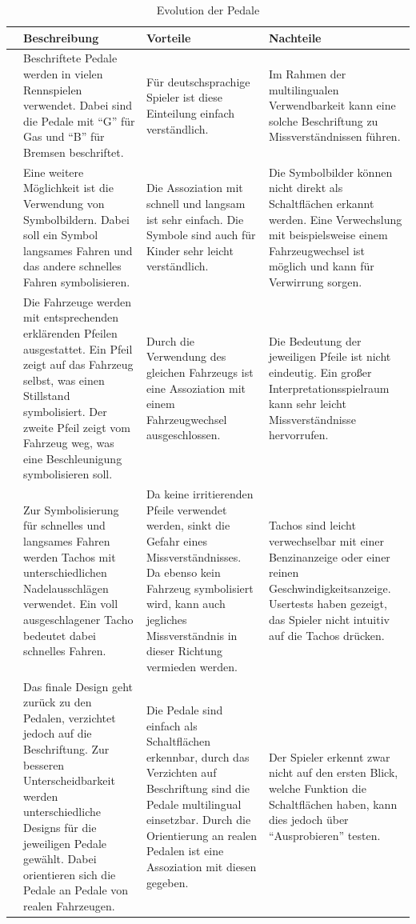 	\begin{longtable}{cp{3.9cm}p{3.9cm}p{3.9cm}}%
		\toprule \endhead%
		\bottomrule \caption{Evolution der Pedale}\label{gasevo-tabelle} \endlastfoot%
			 & Beschreibung & Vorteile & Nachteile \\ \midrule
			\pedaleSchrift 		& Beschriftete Pedale werden in vielen Rennspielen verwendet. Dabei sind die Pedale mit \enquote{G} für Gas und \enquote{B} für Bremsen beschriftet. & Für deutschsprachige Spieler ist diese Einteilung einfach verständlich. & Im Rahmen der multilingualen Verwendbarkeit kann eine solche Beschriftung zu Missverständnissen führen. \\%
			\symbolbild 		& Eine weitere Möglichkeit ist die Verwendung von Symbolbildern. Dabei soll ein Symbol langsames Fahren und das andere schnelles Fahren symbolisieren. & Die Assoziation mit schnell und langsam ist sehr einfach. Die Symbole sind auch für Kinder sehr leicht verständlich. & Die Symbolbilder können nicht direkt als Schaltflächen erkannt werden. Eine Verwechslung mit beispielsweise einem Fahrzeugwechsel ist möglich und kann für Verwirrung sorgen.  \\%
			\autoPfeil 			&  Die Fahrzeuge werden mit entsprechenden erklärenden Pfeilen ausgestattet. Ein Pfeil zeigt auf das Fahrzeug selbst, was einen Stillstand symbolisiert. Der zweite Pfeil zeigt vom Fahrzeug weg, was eine Beschleunigung symbolisieren soll. & Durch die Verwendung des gleichen Fahrzeugs ist eine Assoziation mit einem Fahrzeugwechsel ausgeschlossen. & Die Bedeutung der jeweiligen Pfeile ist nicht eindeutig. Ein großer Interpretationsspielraum kann sehr leicht Missverständnisse hervorrufen. \\%
			\tacho 				& Zur Symbolisierung für schnelles und langsames Fahren werden Tachos mit unterschiedlichen Nadelausschlägen verwendet. Ein voll ausgeschlagener Tacho bedeutet dabei schnelles Fahren. & Da keine irritierenden Pfeile verwendet werden, sinkt die Gefahr eines Missverständnisses. Da ebenso kein Fahrzeug symbolisiert wird, kann auch jegliches Missverständnis in dieser Richtung vermieden werden. & Tachos sind leicht verwechselbar mit einer Benzinanzeige oder einer reinen Geschwindigkeitsanzeige. Usertests haben gezeigt, das Spieler nicht intuitiv auf die Tachos drücken. \\%
			\pedaleRealistisch 	& Das finale Design geht zurück zu den Pedalen, verzichtet jedoch auf die Beschriftung. Zur besseren Unterscheidbarkeit werden unterschiedliche Designs für die jeweiligen Pedale gewählt. Dabei orientieren sich die Pedale an Pedale von realen Fahrzeugen. & Die Pedale sind einfach als Schaltflächen erkennbar, durch das Verzichten auf Beschriftung sind die Pedale multilingual einsetzbar. Durch die Orientierung an realen Pedalen ist eine Assoziation mit diesen gegeben. & Der Spieler erkennt zwar nicht auf den ersten Blick, welche Funktion die Schaltflächen haben, kann dies jedoch über \enquote{Ausprobieren} testen. \\%
	\end{longtable}
